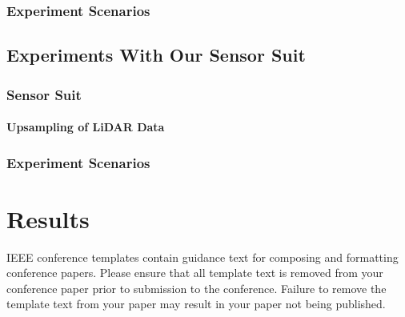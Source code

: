 \documentclass[conference]{IEEEtran}
\begin{document}
\subsubsection{Experiment Scenarios}

\subsection{Experiments With Our Sensor Suit}

\subsubsection{Sensor Suit}
\paragraph{Upsampling of LiDAR Data}

\subsubsection{Experiment Scenarios}


\section{Results}



\vspace{12pt}
\color{red}
IEEE conference templates contain guidance text for composing and formatting conference papers. Please ensure that all template text is removed from your conference paper prior to submission to the conference. Failure to remove the template text from your paper may result in your paper not being published.
\end{document}
